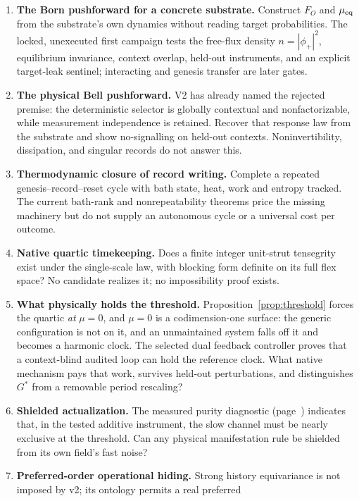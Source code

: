 \documentclass[11pt,a4paper]{article}
\theoremstyle{definition}
\theoremstyle{plain}
\theoremstyle{remark}
\begin{document}
\begin{enumerate}\itemsep3pt
\item \textbf{The Born pushforward for a concrete substrate.} Construct
$F_O$ and $\mu_{\rm eq}$ from the substrate's own dynamics without reading
target probabilities. The locked, unexecuted first campaign tests the
free-flux density $n=|\phi_+|^2$, equilibrium invariance, context overlap,
held-out instruments, and an explicit target-leak sentinel; interacting and
genesis transfer are later gates.
\item \textbf{The physical Bell pushforward.} V2 has already named the
rejected premise: the deterministic selector is globally contextual and
nonfactorizable, while measurement independence is retained. Recover that
response law from the substrate and show no-signalling on held-out contexts.
Noninvertibility, dissipation, and singular records do not answer this.
\item \textbf{Thermodynamic closure of record writing.} Complete a repeated
genesis--record--reset cycle with bath state, heat, work and entropy tracked.
The current bath-rank and nonrepeatability theorems price the missing
machinery but do not supply an autonomous cycle or a universal cost per
outcome.
\item \textbf{Native quartic timekeeping.} Does a finite integer
unit-strut tensegrity exist under the single-scale law, with blocking
form definite on its full flex space? No candidate realizes it; no
impossibility proof exists.
\item \textbf{What physically holds the threshold.} Proposition~\ref{prop:threshold}
forces the quartic \emph{at} $\mu = 0$, and $\mu = 0$ is a
codimension-one surface: the generic configuration is not on it, and an
unmaintained system falls off it and becomes a harmonic clock. The selected
dual feedback controller proves that a context-blind audited loop can hold the
reference clock. What native mechanism pays that work, survives held-out
perturbations, and distinguishes $G^*$ from a removable period rescaling?
\item \textbf{Shielded actualization.} The measured purity diagnostic
(page~\pageref{diag:purity}) indicates that, in the tested additive
instrument, the slow channel must be nearly
exclusive at the threshold. Can any physical manifestation rule be
shielded from its own field's fast noise?
\item \textbf{Preferred-order operational hiding.} Strong history
equivariance is not imposed by v2; its ontology permits a real preferred

\end{enumerate}
\end{document}
